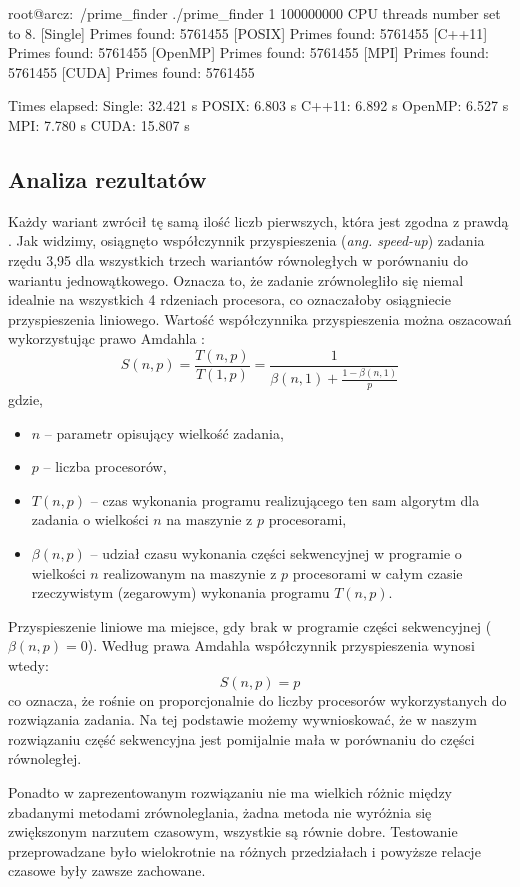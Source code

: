 \documentclass[12pt, twoside, hidelinks, a4paper]{article}
\begin{document}
\begin{boxedverbatim}
root@arcz:~/prime_finder ./prime_finder 1 100000000
CPU threads number set to 8.
[Single] Primes found: 5761455
[POSIX]  Primes found: 5761455
[C++11]  Primes found: 5761455
[OpenMP] Primes found: 5761455
[MPI]    Primes found: 5761455
[CUDA]   Primes found: 5761455

Times elapsed:
Single:	32.421 s
POSIX:	6.803 s
C++11:	6.892 s
OpenMP:	6.527 s
MPI:	7.780 s
CUDA:	15.807 s
\end{boxedverbatim}

\subsection{Analiza rezultatów}
Każdy wariant zwrócił tę samą ilość liczb pierwszych, która jest zgodna z prawdą \cite{c3}. Jak widzimy, osiągnęto współczynnik przyspieszenia (\textit{ang. speed-up}) zadania rzędu 3,95 dla wszystkich trzech wariantów równoległych w porównaniu do wariantu jednowątkowego. Oznacza to, że zadanie zrównolegliło się niemal idealnie na wszystkich 4 rdzeniach procesora, co oznaczałoby osiągniecie przyspieszenia liniowego. Wartość współczynnika przyspieszenia można oszacowań wykorzystując prawo Amdahla \cite{c4}:
\begin{equation}
S(n,p)=\frac{T(n,p)}{T(1,p)}=\frac{1}{\beta(n,1)+\frac{1-\beta(n,1)}{p}}
\end{equation}
gdzie,
\begin{itemize}
\item $n$ – parametr opisujący wielkość zadania,
\item $p$ – liczba procesorów,
\item $T(n, p)$ – czas wykonania programu realizującego ten sam algorytm dla zadania o wielkości $n$ na maszynie z $p$ procesorami,
\item $\beta(n, p)$ – udział czasu wykonania części sekwencyjnej w programie o wielkości $n$ realizowanym na maszynie z $p$ procesorami w całym czasie rzeczywistym (zegarowym) wykonania programu $T(n, p)$.
\end{itemize}
Przyspieszenie liniowe ma miejsce, gdy brak w programie części sekwencyjnej (\textit{$\beta(n, p) = 0$}). Według prawa Amdahla współczynnik przyspieszenia wynosi wtedy:
\begin{equation}
S(n, p) = p
\end{equation}
co oznacza, że rośnie on proporcjonalnie do liczby procesorów wykorzystanych do rozwiązania zadania. Na tej podstawie możemy wywnioskować, że w naszym rozwiązaniu część sekwencyjna jest pomijalnie mała w porównaniu do części równoległej.

Ponadto w zaprezentowanym rozwiązaniu nie ma wielkich różnic między zbadanymi metodami zrównoleglania, żadna metoda nie wyróżnia się zwiększonym narzutem czasowym, wszystkie są równie dobre. Testowanie przeprowadzane było wielokrotnie na różnych przedziałach i powyższe relacje czasowe były zawsze zachowane.

\printbibliography
\end{document}
